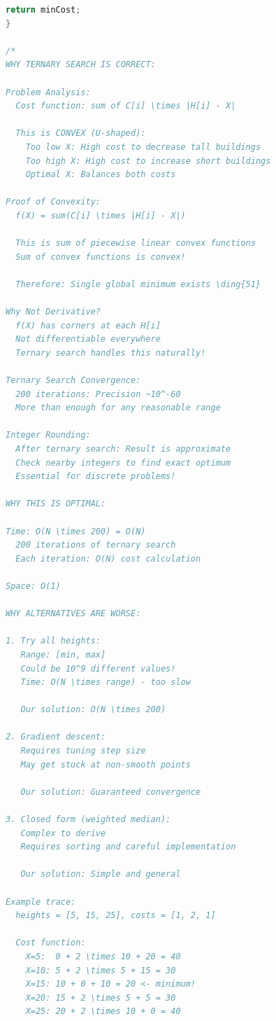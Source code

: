 \documentclass[11pt,a4paper,oneside]{book}
\begin{document}
\begin{lstlisting}[language=C++, caption=Complete Basic Optimization Solutions - NEW PROBLEMS]
    return minCost;
}

/*
WHY TERNARY SEARCH IS CORRECT:

Problem Analysis:
  Cost function: sum of C[i] \times |H[i] - X|
  
  This is CONVEX (U-shaped):
    Too low X: High cost to decrease tall buildings
    Too high X: High cost to increase short buildings
    Optimal X: Balances both costs

Proof of Convexity:
  f(X) = sum(C[i] \times |H[i] - X|)
  
  This is sum of piecewise linear convex functions
  Sum of convex functions is convex!
  
  Therefore: Single global minimum exists \ding{51}

Why Not Derivative?
  f(X) has corners at each H[i]
  Not differentiable everywhere
  Ternary search handles this naturally!

Ternary Search Convergence:
  200 iterations: Precision ~10^-60
  More than enough for any reasonable range

Integer Rounding:
  After ternary search: Result is approximate
  Check nearby integers to find exact optimum
  Essential for discrete problems!

WHY THIS IS OPTIMAL:

Time: O(N \times 200) = O(N)
  200 iterations of ternary search
  Each iteration: O(N) cost calculation

Space: O(1)

WHY ALTERNATIVES ARE WORSE:

1. Try all heights:
   Range: [min, max]
   Could be 10^9 different values!
   Time: O(N \times range) - too slow
   
   Our solution: O(N \times 200)

2. Gradient descent:
   Requires tuning step size
   May get stuck at non-smooth points
   
   Our solution: Guaranteed convergence

3. Closed form (weighted median):
   Complex to derive
   Requires sorting and careful implementation
   
   Our solution: Simple and general

Example trace:
  heights = [5, 15, 25], costs = [1, 2, 1]
  
  Cost function:
    X=5:  0 + 2 \times 10 + 20 = 40
    X=10: 5 + 2 \times 5 + 15 = 30
    X=15: 10 + 0 + 10 = 20 <- minimum!
    X=20: 15 + 2 \times 5 + 5 = 30
    X=25: 20 + 2 \times 10 + 0 = 40
  

\end{lstlisting}
\end{document}
